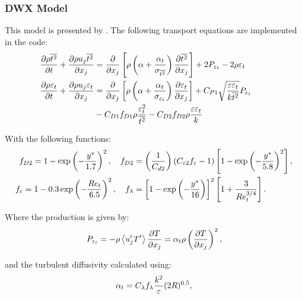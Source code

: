 

\subsubsection{DWX Model}
This model is presented by \cite{deng2001near}.
The following transport equations are implemented in the code:
\begin{equation} \label{eq:ktDeng}
\begin{split}
\frac{\partial \rho \overline{t^2}}{\partial t} + \frac{\partial \rho u_j \overline{t^2}}{\partial x_j} &= \frac{\partial}{\partial x_j}\left[\rho \left(\alpha + \frac{\alpha_t}{\sigma_{\overline{t^2}}}\right)\frac{\partial \overline{t^2}}{\partial x_j}\right] + 2 P_{{\varepsilon}_t}- 2 \rho \varepsilon_t \\
\frac{\partial \rho \varepsilon_t}{\partial t} + \frac{\partial \rho u_j \varepsilon_t}{\partial x_j} &= \frac{\partial}{\partial x_j}\left[\rho \left(\alpha + \frac{\alpha_t}{\sigma_{\varepsilon_t}}\right)\frac{\partial \varepsilon_t}{\partial x_j}\right] + C_{P1}\sqrt{\frac{{\varepsilon}{\varepsilon}_t}{k\overline{t^2}}} P_{{\varepsilon}_t} \qquad \\ &- C_{D1} f_{D1}\rho\frac{{\varepsilon}_t^2}{\overline{t^2}}  - C_{D2} f_{D2}\rho\frac{{\varepsilon}{\varepsilon}_t}{k}   
\end{split}
\end{equation}

With the following functions:
\begin{equation}
\begin{split}
f_{D2} = 1-\exp\left(-\frac{y^*}{1.7}\right)^2,\quad f_{D2} &= \left(\frac{1}{C_{d2}}\right)(C_{{\varepsilon}2}f_{\varepsilon}-1)\left[1-\exp\left(-\frac{y^*}{5.8}\right)^2\right], \\
f_{\varepsilon} = 1-0.3\exp\left(-\frac{Re_t}{6.5}\right)^2, \quad f_\lambda &= \left[1-\exp\left(-\frac{y^*}{16}\right)\right]^2\left[1+\frac{3}{Re_t^{3/4}}\right].
\end{split}
\end{equation}

Where the production is given by:
\begin{equation}
P_{{\varepsilon}_t}=-\rho \left<{u'_j T'}\right> \frac{\partial T}{ \partial x_j}= \alpha_t \rho \left(\frac{ \partial T}{\partial x_j}\right)^2,
\end{equation} 

and the turbulent diffusivity calculated using:
\begin{equation}
\alpha_t = C_\lambda f_\lambda \frac{k^2}{{\varepsilon}}(2R)^{0.5},
\end{equation} 

